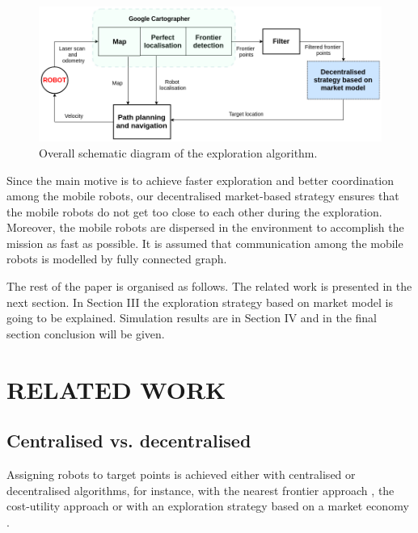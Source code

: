 \documentclass[letterpaper, 10 pt, conference]{ieeeconf}  %
\begin{document}
\begin{figure}[t]
    \centering\includegraphics[width=1.0\columnwidth]{diagram_exploration.png}
	\caption{Overall schematic diagram of the exploration algorithm.}
   \label{fig:exploration-strategy}
\end{figure}

Since the main motive is to achieve faster exploration and better coordination among the mobile robots, our decentralised market-based strategy ensures that the mobile robots do not get too close to each other during the exploration. Moreover, the mobile robots are dispersed in the environment to accomplish the mission as fast as possible. It is assumed that communication among the mobile robots is modelled by fully connected graph.

The rest of the paper is organised as follows. The related work is presented in the next section. In Section III the exploration strategy based on market model is going to be explained. Simulation results are in Section IV and in the final section conclusion will be given.

\section{RELATED WORK}

 \subsection{Centralised vs. decentralised}
Assigning robots to target points is achieved either with centralised or decentralised algorithms, for instance, with the nearest frontier approach \cite{Yamauchi}, the cost-utility approach \cite{burgard} or  with an exploration strategy based on a market economy \cite{market-economy}. 
\end{document}
